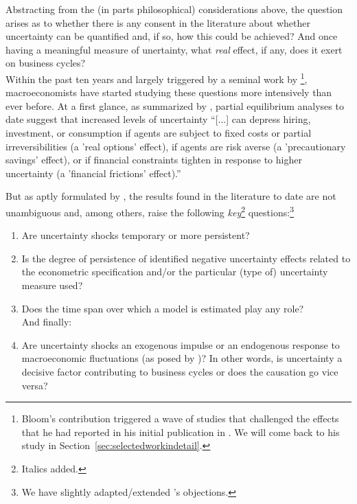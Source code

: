 \documentclass[a4paper,11pt,listof=nochaptergap,oneside,pointednumbers,bibtotoc,bigheadings,liststotoc,hidelinks]{scrbook}
\theoremstyle{mysatz}
\theoremstyle{mydefinition}
\theoremstyle{mytheorem}
\theoremstyle{mybemerkung}
\begin{document}
Abstracting from the (in parts philosophical) considerations above, the question arises as to whether there is any consent in the literature about whether uncertainty can be quantified and, if so, how this could be achieved? And once having a meaningful measure of unertainty, what \textit{real} effect, if any, does it exert on business cycles?\\

Within the past ten years and largely triggered by a seminal work by \citet{bloom:09}\footnote{Bloom's contribution triggered a wave of studies that challenged the effects that he had reported in his initial publication in \citet{bloom:09}. We will come back to his study in Section~\ref{sec:selectedworkindetail}.}, macroeconomists have started studying these questions more intensively than ever before. At a first glance, as summarized by \citet[p. 1177]{juradoetal:15}, partial equilibrium analyses to date suggest that increased levels of uncertainty ``[...] can depress hiring, investment, or consumption if agents are subject to fixed costs or partial irreversibilities (a 'real options' effect), if agents are risk averse (a 'precautionary savings' effect), or if financial constraints tighten in response to higher uncertainty (a 'financial frictions' effect).''

But as aptly formulated by \citet[p. 24]{bontempietal:16}, the results found in the literature to date are not unambiguous and, among others, raise the following \textit{key}\footnote{Italics added.} questions:\footnote{We have slightly adapted/extended \citet{bontempietal:16}'s objections.}
\begin{enumerate}
	\item Are uncertainty shocks temporary or more persistent?
	\item Is the degree of persistence of identified negative uncertainty effects related to the econometric specification and/or the particular (type of) uncertainty measure used? 
	\item Does the time span over which a model is estimated play any role? \\
	And finally:
	\item Are uncertainty shocks an exogenous impulse or an endogenous response to macroeconomic fluctuations (as posed by \citealp{ludvigsonetal:18})? In other words, is uncertainty a decisive factor contributing to business cycles or does the causation go vice versa?
\end{enumerate}
\end{document}
